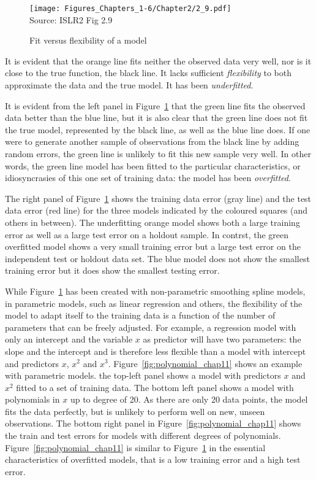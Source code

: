 \begin{figure}[b]
\centering
\texttt{[image: Figures\_Chapters\_1-6/Chapter2/2\_9.pdf]} \\

\scriptsize Source: ISLR2 Fig 2.9
\caption{Fit versus flexibility of a model}
\label{fig:freedom}
\end{figure}

It is evident that the orange line fits neither the observed data very well, nor is it close to the true function, the black line. It lacks sufficient \emph{flexibility} to both approximate the data and the true model. It has been \emph{underfitted}.

It is evident from the left panel in Figure~\ref{fig:freedom} that the green line fits the observed data better than the blue line, but it is also clear that the green line does not fit the true model, represented by the black line, as well as the blue line does. If one were to generate another sample of observations from the black line by adding random errors, the green line is unlikely to fit this new sample very well. In other words, the green line model has been fitted to the particular characteristics, or idiosyncrasies of this one set of training data: the model has been \emph{overfitted}.

The right panel of Figure~\ref{fig:freedom} shows the training data error (gray line) and the test data error (red line) for the three models indicated by the coloured squares (and others in between). The underfitting orange model shows both a large training error as well as a large test error on a holdout sample. In contrst, the green overfitted model shows a very small training error but a large test error on the independent test or holdout data set. The blue model does not show the smallest training error but it does show the smallest testing error.

While Figure~\ref{fig:freedom} has been created with non-parametric smoothing spline models, in parametric models, such as linear regression and others, the flexibility of the model to adapt itself to the training data is a function of the number of parameters that can be freely adjusted. For example, a regression model with only an intercept and the variable $x$ as predictor will have two parameters: the slope and the intercept and is therefore less flexible than a model with intercept and predictors $x$, $x^2$ and $x^3$. Figure~\ref{fig:polynomial_chap11} shows an example with parametric models. the top-left panel shows a model with predictors $x$ and $x^2$ fitted to a set of training data. The bottom left panel shows a model with polynomials in $x$ up to degree of 20. As there are only 20 data points, the model fits the data perfectly, but is unlikely to perform well on new, unseen observations. The bottom right panel in Figure~\ref{fig:polynomial_chap11} shows the train and test errors for models with different degrees of polynomials. Figure~\ref{fig:polynomial_chap11} is similar to Figure~\ref{fig:freedom} in the essential characteristics of overfitted models, that is a low training error and a high test error.

